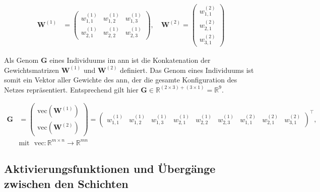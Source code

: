 \begin{equation}
    \begin{aligned}
        \mathbf{W}^{(1)} &=
        \begin{pmatrix}
            w_{1,1}^{(1)} & w_{1,2}^{(1)} & w_{1,3}^{(1)} \\
            w_{2,1}^{(1)} & w_{2,2}^{(1)} & w_{2,3}^{(1)}
        \end{pmatrix}, \quad
        \mathbf{W}^{(2)} =
        \begin{pmatrix}
            w_{1,1}^{(2)} \\
            w_{2,1}^{(2)} \\
            w_{3,1}^{(2)}
        \end{pmatrix}
    \end{aligned}
    \label{eq:03-02-01_weight-vectors}
\end{equation}

Als Genom $\mathbf{G}$ eines Individuums im \Gls{ann} ist die Konkatenation der Gewichtsmatrizen $\mathbf{W}^{(1)}$ und $\mathbf{W}^{(2)}$ definiert. Das Genom eines Individuums ist somit ein Vektor aller Gewichte des \Gls{ann}, der die gesamte Konfiguration des Netzes repräsentiert. Entsprechend gilt hier $\mathbf{G} \in \mathbb{R}^{(2 \times 3) + (3 \times 1)} = \mathbb{R}^{9}$.

\begin{equation}
    \begin{aligned}
        \mathbf{G} &=
        \begin{pmatrix}
            \mathrm{vec}\!\left(\mathbf{W}^{(1)}\right) \\
            \mathrm{vec}\!\left(\mathbf{W}^{(2)}\right)
        \end{pmatrix}
        =
        \begin{pmatrix}
            w_{1,1}^{(1)} &
            w_{1,2}^{(1)} &
            w_{1,3}^{(1)} &
            w_{2,1}^{(1)} &
            w_{2,2}^{(1)} &
            w_{2,3}^{(1)} &
            w_{1,1}^{(2)} &
            w_{2,1}^{(2)} &
            w_{3,1}^{(2)}
        \end{pmatrix}^{\top}, \\
        &\text{mit} \text{ } \mathrm{vec}: \mathbb{R}^{m \times n} \rightarrow \mathbb{R}^{mn}
    \end{aligned}
    \label{eq:03-02-01_genome-vector}
\end{equation}

\subsection{Aktivierungsfunktionen und Übergänge zwischen den Schichten}
\label{sec:03-02-02_activation-functions-and-transitions-between-layers}

